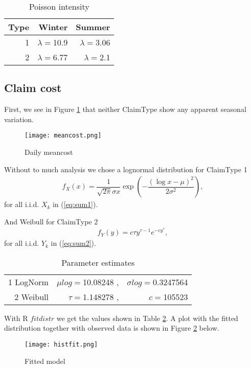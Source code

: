 \documentclass[11pt]{article}
\begin{document}
\begin{table}[h]
\center
\begin{tabular}{r|rr}
Type & Winter & Summer \\ 
\hline
1 & $\lambda=$10.9 & $\lambda=$3.06 \\
2 & $\lambda=$6.77 & $\lambda=$2.1\\
\hline
\end{tabular}
\caption{Poisson intensity} \label{tab:lambda}
\end{table}


\subsection*{Claim cost}
First,  we see in Figure \ref{fig:samplefig2} that neither ClaimType show any apparent seasonal variation.
 \begin{figure}[h]
 \center
  \texttt{[image: meancost.png]}
  \caption{Daily meancost}
  \label{fig:samplefig2}
\end{figure}

Without to much analysis we chose a lognormal distribution for
ClaimType 1
\begin{align*}
	f_{X}(x) = \dfrac{1}{\sqrt{2\pi}\sigma x} \exp\left(-\dfrac{(\log x - \mu)^2}{2\sigma^2}\right) , 
\end{align*}
for all i.i.d. $X_k$ in (\ref{eq:sum1}).

And Weibull for
ClaimType 2
\begin{align*}
	f_{Y}(y) = c \tau y^{\tau - 1}e^{-cy^\tau} , 
\end{align*}
for all i.i.d. $Y_k$ in (\ref{eq:sum2}).


\begin{table}[h]
\center
\begin{tabular}{|r|rr|}
\hline
1 LogNorm & $\mu log=$10.08248 ,& $\sigma log=$0.3247564 \\
2 Weibull & $\tau=$1.148278 ,& $c=$105523\\
\hline
\end{tabular}
\caption{Parameter estimates} \label{tab:cost}
\end{table}

With R $fitdistr$ we get the values shown in Table \ref{tab:cost}. A plot with the fitted distribution together with
observed data is shown in Figure \ref{fig:xxx} below.
 \begin{figure}[H]
 \center
  \texttt{[image: histfit.png]}
 \caption{Fitted model}
  \label{fig:xxx}
\end{figure}
\end{document}
